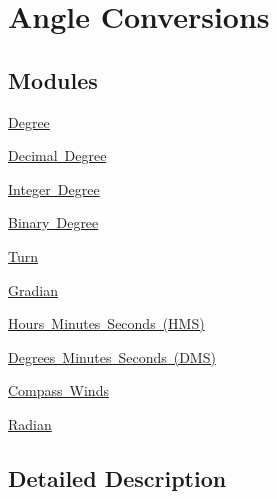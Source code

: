 \hypertarget{group___e_g_x_math-_angle_conversions}{}\section{Angle Conversions}
\label{group___e_g_x_math-_angle_conversions}
\subsection*{Modules}
\begin{DoxyCompactItemize}
\item 
\mbox{\hyperlink{group___e_g_x_math-_angle_conversions-_degree}{Degree}}
\item 
\mbox{\hyperlink{group___e_g_x_math-_angle_conversions-_decimal_degree}{Decimal Degree}}
\item 
\mbox{\hyperlink{group___e_g_x_math-_angle_conversions-_integer_degree}{Integer Degree}}
\item 
\mbox{\hyperlink{group___e_g_x_math-_angle_conversions-_binary_degree}{Binary Degree}}
\item 
\mbox{\hyperlink{group___e_g_x_math-_angle_conversions-_turn}{Turn}}
\item 
\mbox{\hyperlink{group___e_g_x_math-_angle_conversions-_gradian}{Gradian}}
\item 
\mbox{\hyperlink{group___e_g_x_math-_angle_conversions-_h_m_s}{Hours Minutes Seconds (\+H\+M\+S)}}
\item 
\mbox{\hyperlink{group___e_g_x_math-_angle_conversions-_d_m_s}{Degrees Minutes Seconds (\+D\+M\+S)}}
\item 
\mbox{\hyperlink{group___e_g_x_math-_angle_conversions-_compass_winds}{Compass Winds}}
\item 
\mbox{\hyperlink{group___e_g_x_math-_angle_conversions-_radian}{Radian}}
\end{DoxyCompactItemize}


\subsection{Detailed Description}
